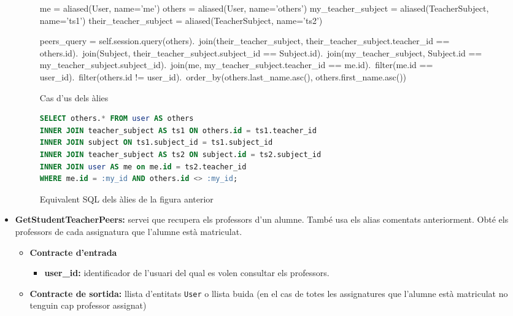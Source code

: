 \begin{itemize}
			\begin{figure}[h!]
				\begin{python}
me = aliased(User, name='me')
others = aliased(User, name='others')
my_teacher_subject = aliased(TeacherSubject, name='ts1')
their_teacher_subject = aliased(TeacherSubject, name='ts2')

peers_query = self.session.query(others).\
	join(their_teacher_subject, their_teacher_subject.teacher_id == others.id).\
	join(Subject, their_teacher_subject.subject_id == Subject.id).\
	join(my_teacher_subject, Subject.id == my_teacher_subject.subject_id).\
	join(me, my_teacher_subject.teacher_id == me.id).\
	filter(me.id == user_id).\
	filter(others.id != user_id).\
	order_by(others.last_name.asc(), others.first_name.asc())
	 			\end{python}
	 			\label{fig:alias_sqlalchemy}
	 			\caption{Cas d'us dels àlies}
	 		\end{figure}
	 		
	 		\begin{figure}[h]
	 			\begin{lstlisting}[language=SQL, frame=none]
SELECT others.* FROM user AS others
INNER JOIN teacher_subject AS ts1 ON others.id = ts1.teacher_id
INNER JOIN subject ON ts1.subject_id = ts1.subject_id
INNER JOIN teacher_subject AS ts2 ON subject.id = ts2.subject_id
INNER JOIN user AS me on me.id = ts2.teacher_id
WHERE me.id = :my_id AND others.id <> :my_id;
				\end{lstlisting}
				\label{fig:alias_sqlalchemy_sql}
				\caption{Equivalent \ac{SQL} dels àlies de la figura anterior}
			\end{figure}
			
			\item \textbf{GetStudentTeacherPeers:} servei que recupera els professors d'un alumne. També usa els alias comentats anteriorment. Obté els professors de cada assignatura que l'alumne està matriculat.
			
			\begin{itemize}
					\item \textbf{Contracte d'entrada}
						\begin{itemize}
							\item \textbf{user\_id:} identificador de l'usuari del qual es volen consultar els professors.
						\end{itemize}
					\item \textbf{Contracte de sortida:} llista d'entitats \texttt{User} o llista buida (en el cas de totes les assignatures que l'alumne està matriculat no tenguin cap professor assignat)
				\end{itemize}
				

\end{itemize}
